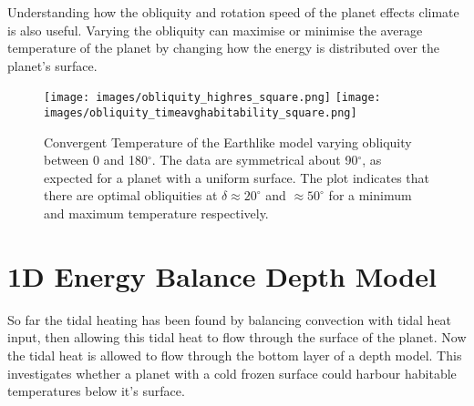 \documentclass[12pt, onecolumn]{revtex4-2}    %
\begin{document}
Understanding how the obliquity and rotation speed of the planet effects climate is also useful.
Varying the obliquity can maximise or minimise the average temperature of the planet by changing how the energy is distributed over the planet's surface.


\begin{figure}
    \texttt{[image: images/obliquity\_highres\_square.png]}
    \texttt{[image: images/obliquity\_timeavghabitability\_square.png]}
    \caption{Convergent Temperature of the Earthlike model varying obliquity between 0 and 180$^{\circ}$.
        The data are symmetrical about 90$^{\circ}$, as expected for a planet with a uniform surface.
        The plot indicates that there are optimal obliquities at $\delta \approx 20^{\circ}$ and $\approx 50^{\circ}$ for a minimum and maximum temperature respectively.
    }
    \label{fig:temperature_obliquity}
\end{figure}

%     

\section{1D Energy Balance Depth Model} \label{sec:ebdmodel}

So far the tidal heating has been found by balancing convection with tidal heat input, then allowing this tidal heat to flow through the surface of the planet.
Now the tidal heat is allowed to flow through the bottom layer of a depth model.
This investigates whether a planet with a cold frozen surface could harbour habitable temperatures below it's surface.
\end{document}
